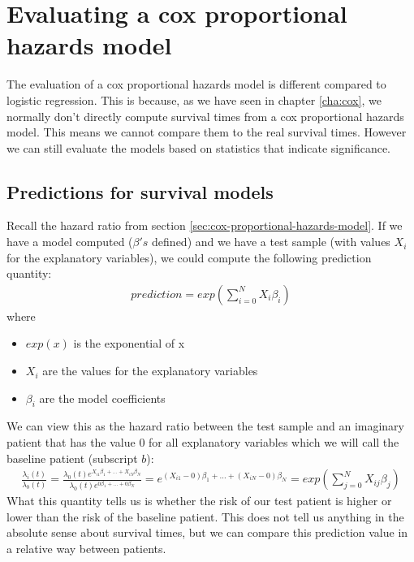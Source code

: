 \section{Evaluating a cox proportional hazards model}
\label{sec:evaluation-coxph}
The evaluation of a cox proportional hazards model is different compared to logistic regression\cite{newson2010comparing}\cite{harrell1996tutorial}. This is because, as we have seen in chapter \ref{cha:cox}, we normally don't directly compute survival times from a cox proportional hazards model. This means we cannot compare them to the real survival times. However we can still evaluate the models based on statistics that indicate significance.

\subsection{Predictions for survival models}
Recall the hazard ratio from section \ref{sec:cox-proportional-hazards-model}. If we have a model computed ($\beta's$ defined) and we have a test sample (with values $X_{i}$ for the explanatory variables), we could compute the following prediction quantity:
\begin{equation}
\begin{split}
prediction = exp(\sum_{i=0}^{N}X_{i}\beta_{i})
\end{split}
\end{equation}
where
\begin{itemize}
	\item $exp(x)$ is the exponential of x
	\item $X_{i}$ are the values for the explanatory variables
	\item $\beta_{i}$ are the model coefficients
\end{itemize}
 We can view this as the hazard ratio between the test sample and an imaginary patient that has the value $0$ for all explanatory variables which we will call the baseline patient (subscript $b$):
 \begin{equation}
 \begin{split}
 \frac{\lambda_{i}(t)}{\lambda_{b}(t)} 
 = \frac{\lambda_{0}(t)e^{X_{i1}\beta_{1} + ... + X_{iN}\beta_{N}}}{\lambda_{0}(t)e^{0\beta_{1} + ... + 0\beta_{N}}}
 = e^{(X_{i1}-0)\beta_{1} + ... + (X_{iN}-0)\beta_{N}} = exp(\sum_{j=0}^{N}X_{ij}\beta_{j})
 \end{split}
 \end{equation}
 What this quantity tells us is whether the risk of our test patient is higher or lower than the risk of the baseline patient. This does not tell us anything in the absolute sense about survival times, but we can compare this prediction value in a relative way between patients. \\ \\

